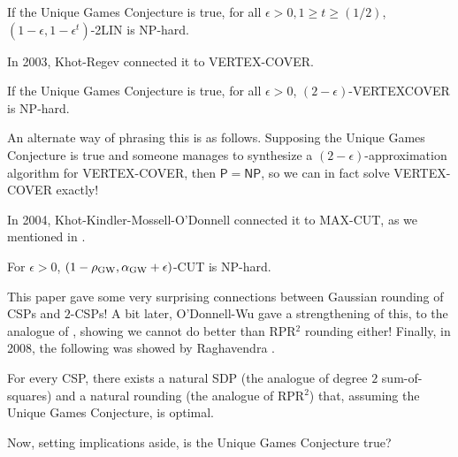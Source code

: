 		\begin{theorem}[Khot]
			If the Unique Games Conjecture is true, for all $\epsilon > 0, 1 \ge t \ge (1/2)$, $(1-\epsilon,1-\epsilon^t)$-2LIN is \textsf{NP}-hard.
		\end{theorem}

		In 2003, Khot-Regev \cite{khot-regev-ugc-vtxcov} connected it to VERTEX-COVER.

		\begin{theorem}
			If the Unique Games Conjecture is true, for all $\epsilon > 0$, $(2-\epsilon)$-VERTEXCOVER is \textsf{NP}-hard.
		\end{theorem}
		An alternate way of phrasing this is as follows. Supposing the Unique Games Conjecture is true and someone manages to synthesize a $(2-\epsilon)$-approximation algorithm for VERTEX-COVER, then $\mathsf{P} = \mathsf{NP}$, so we can in fact solve VERTEX-COVER exactly!

		In 2004, Khot-Kindler-Mossell-O'Donnell \cite{max-cut-ugc} connected it to MAX-CUT, as we mentioned in .

		\begin{theorem}
			For $\epsilon > 0$, $(1-\rho_\text{GW},\alpha_{\text{GW}}+\epsilon)$-CUT is \textsf{NP}-hard.
		\end{theorem}
		This paper gave some very surprising connections between Gaussian rounding of CSPs and $2$-CSPs! A bit later, O'Donnell-Wu gave a strengthening of this, to the analogue of , showing we cannot do better than RPR$^2$ rounding either! Finally, in 2008, the following was showed by Raghavendra \cite{raghavendra-punchline}.

		\begin{ftheo}[Raghavendra]
			For every CSP, there exists a natural SDP (the analogue of degree $2$ sum-of-squares) and a natural rounding (the analogue of RPR$^2$) that, assuming the Unique Games Conjecture, is optimal.
		\end{ftheo}


		Now, setting implications aside, is the Unique Games Conjecture true?\\

